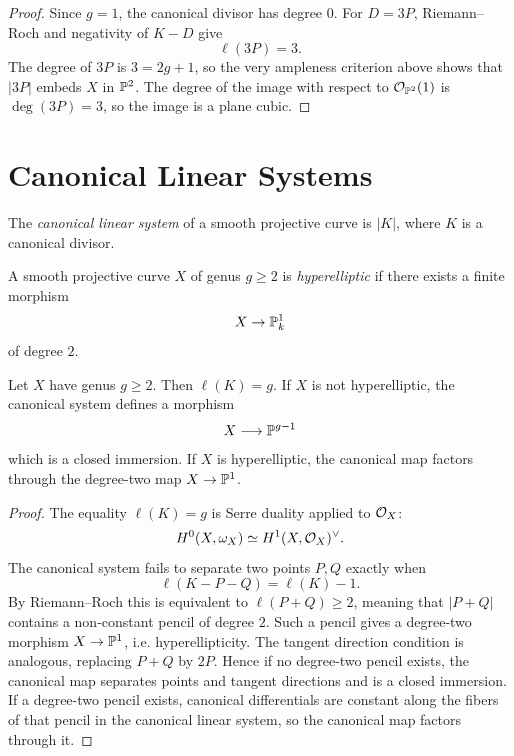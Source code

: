 \begin{proof}
Since \(g=1\), the canonical divisor has degree \(0\).  For \(D=3P\),
Riemann--Roch and negativity of \(K-D\) give
\[
    \ell(3P)=3.
\]
The degree of \(3P\) is \(3=2g+1\), so the very ampleness criterion above shows
that \(|3P|\) embeds \(X\) in \(\mathbb{P}^2\).  The degree of the image with respect
to \(\mathcal{O}_{\mathbb{P}^2}(1)\) is \(\deg(3P)=3\), so the image is a plane cubic.
\end{proof}

\section{Canonical Linear Systems}

\begin{definition}
The \emph{canonical linear system} of a smooth projective curve is \(|K|\),
where \(K\) is a canonical divisor.
\end{definition}

\begin{definition}
A smooth projective curve \(X\) of genus \(g\ge2\) is \emph{hyperelliptic} if
there exists a finite morphism
\[
    X\to\mathbb{P}^1_k
\]
of degree \(2\).
\end{definition}

\begin{proposition}
Let \(X\) have genus \(g\ge2\).  Then \(\ell(K)=g\).  If \(X\) is not
hyperelliptic, the canonical system defines a morphism
\[
    X\longrightarrow \mathbb{P}^{g-1}
\]
which is a closed immersion.  If \(X\) is hyperelliptic, the canonical map
factors through the degree-two map \(X\to\mathbb{P}^1\).
\end{proposition}

\begin{proof}
The equality \(\ell(K)=g\) is Serre duality applied to \(\mathcal{O}_X\):
\[
    H^0(X,\omega_X)\simeq H^1(X,\mathcal{O}_X)^\vee.
\]
The canonical system fails to separate two points \(P,Q\) exactly when
\[
    \ell(K-P-Q)=\ell(K)-1.
\]
By Riemann--Roch this is equivalent to \(\ell(P+Q)\ge2\), meaning that
\(|P+Q|\) contains a non-constant pencil of degree \(2\).  Such a pencil gives
a degree-two morphism \(X\to\mathbb{P}^1\), i.e. hyperellipticity.  The tangent
direction condition is analogous, replacing \(P+Q\) by \(2P\).  Hence if no
degree-two pencil exists, the canonical map separates points and tangent
directions and is a closed immersion.  If a degree-two pencil exists, canonical
differentials are constant along the fibers of that pencil in the canonical
linear system, so the canonical map factors through it.
\end{proof}

